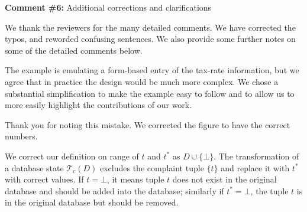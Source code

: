 \noindent
\textbf{Comment \#6:} Additional corrections and clarifications

\smallskip

We thank the reviewers for the many detailed comments. We have corrected the
typos, and reworded confusing sentences. We also provide some further notes on
some of the detailed comments below.

\begin{quote}
\end{quote}

The example is emulating a form-based entry of the tax-rate information, but
we agree that in practice the design would be much more complex. We chose a
substantial simplification to make the example easy to follow and to allow us
to more easily highlight the contributions of our work.

\begin{quote}
\end{quote}

Thank you for noting this mistake. We corrected the figure to have the
correct numbers.


\begin{quote}
\end{quote}

 


\begin{quote}
\end{quote}

We correct our definition on range of $t$ and $t^*$ as $D \cup \{\bot\}$. The transformation of 
a database state $\mathcal{T}_c(D)$ excludes the complaint tuple $\{t\}$ and replace it with 
$t^*$ with correct values. If $t = \bot$, it means tuple $t$ does not exist in the original
database and should be added into the database; similarly if $t^* = \bot$, the tuple $t$ is in
the original database but should be removed. 

